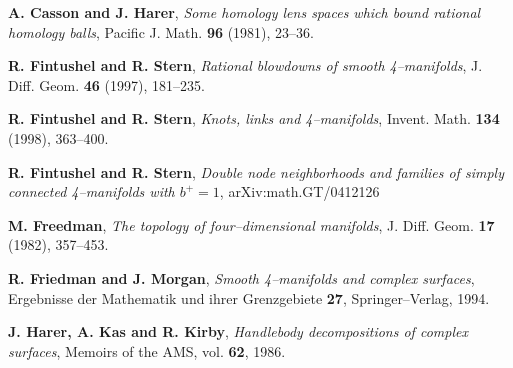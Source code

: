 \documentclass[11pt]{gtart}
\theoremstyle{definition}
\numberwithin{equation}{section}
\begin{document}
\begin{thebibliography}[AAA]



{\bf A. Casson and J. Harer},
{\it Some homology lens spaces which bound rational homology balls},
Pacific J. Math. {\bf96} (1981), 23--36.



 {\bf R. Fintushel and R. Stern},
{\it Rational blowdowns of smooth 4--manifolds}, J. Diff. Geom. {\bf46}
(1997), 181--235.

 {\bf R. Fintushel and R. Stern},
{\it Knots, links and 4--manifolds}, Invent. Math. {\bf134}
(1998), 363--400.

 {\bf R. Fintushel and R. Stern},
{\it Double node neighborhoods and families of simply connected
4--manifolds with $b^+=1$}, arXiv:math.GT/0412126

 {\bf M. Freedman},
{\it The topology of four--dimensional manifolds},
J. Diff. Geom. {\bf17} (1982), 357--453.


 {\bf R. Friedman and J. Morgan}, 
{\it Smooth 4--manifolds and complex surfaces}, Ergebnisse der Mathematik und
ihrer Grenzgebiete {\bf27}, Springer--Verlag, 1994.


 {\bf J. Harer, A. Kas and R. Kirby}, 
{\it Handlebody decompositions of complex surfaces},
Memoirs of the AMS, vol. {\bf62}, 1986.



\end{thebibliography}
\end{document}
